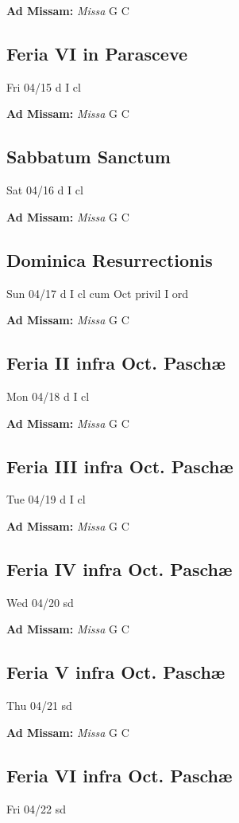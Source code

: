 \documentclass[letterpaper, 10pt, twocolumn]{article}
\begin{document}
\textbf{Ad Missam:} \textit{Missa} G C 

\subsection*{Feria VI in Parasceve}Fri 04/15 d I cl

\textbf{Ad Missam:} \textit{Missa} G C 

\subsection*{Sabbatum Sanctum}Sat 04/16 d I cl

\textbf{Ad Missam:} \textit{Missa} G C 

\subsection*{Dominica Resurrectionis}Sun 04/17 d I cl cum Oct privil I ord

\textbf{Ad Missam:} \textit{Missa} G C 

\subsection*{Feria II infra Oct. Paschæ}Mon 04/18 d I cl

\textbf{Ad Missam:} \textit{Missa} G C 

\subsection*{Feria III infra Oct. Paschæ}Tue 04/19 d I cl

\textbf{Ad Missam:} \textit{Missa} G C 

\subsection*{Feria IV infra Oct. Paschæ}Wed 04/20 sd

\textbf{Ad Missam:} \textit{Missa} G C 

\subsection*{Feria V infra Oct. Paschæ}Thu 04/21 sd

\textbf{Ad Missam:} \textit{Missa} G C 

\subsection*{Feria VI infra Oct. Paschæ}Fri 04/22 sd
\end{document}
